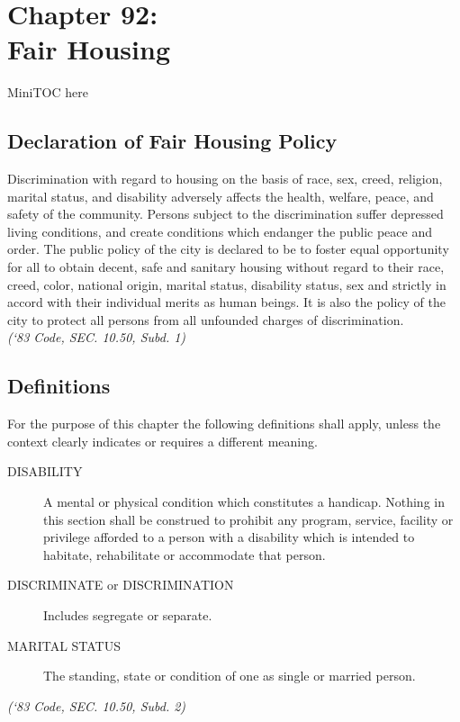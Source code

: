 %
\chapter*{Chapter 92: \\
	Fair Housing}

MiniTOC here
\pagebreak

\section{Declaration of Fair Housing Policy}
Discrimination with regard to housing on the basis of race, sex, creed, religion, marital status, and disability adversely affects the health, welfare, peace, and safety of the community.  Persons subject to the discrimination suffer depressed living conditions, and create conditions which endanger the public peace and order. The public policy of the city is declared to be to foster equal opportunity for all to obtain decent, safe and sanitary housing without regard to their race, creed, color, national origin, marital status, disability status, sex and strictly in accord with their individual merits as human beings. It is also the policy of the city to protect all persons from all unfounded charges of discrimination.\\
\emph{(‘83 Code, SEC. 10.50, Subd. 1)}
\section{Definitions}
For the purpose of this chapter the following definitions shall apply, unless the context clearly indicates or requires a different meaning.
\begin{description}
\item[DISABILITY] A mental or physical condition which constitutes a handicap.  Nothing in this section shall be construed to prohibit any program, service, facility or privilege afforded to a person with a disability which is intended to habitate, rehabilitate or accommodate that person.
\item[DISCRIMINATE or DISCRIMINATION] Includes segregate or separate.
\item[MARITAL STATUS] The standing, state or condition of one as single or married person.
\end{description}
\emph{(‘83 Code, SEC. 10.50, Subd. 2)}

